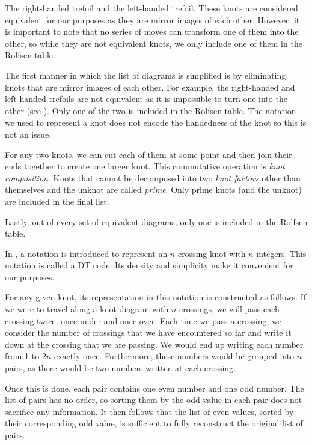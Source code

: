 \begin{paper}
{The right-handed trefoil and the left-handed trefoil.
These knots are considered equivalent for our purposes as they are mirror images
of each other.
However, it is important to note that no series of moves can transform one of
them into the other, so while they are not equivalent knots, we only include one
of them in the Rolfsen table.}

The first manner in which the list of diagrams is simplified is by eliminating
knots that are mirror images of each other.
For example, the right-handed and left-handed trefoils are not equivalent as it
is impossible to turn one into the other (see \figTrefoil).
Only one of the two is included in the Rolfsen table.
The notation we used to represent a knot does not encode the handedness of the
knot so this is not an issue.

For any two knots, we can cut each of them at some point and then join their
ends together to create one larger knot.
This commutative operation is \textit{knot composition}.
Knots that cannot be decomposed into two \textit{knot factors} other than
themselves and the unknot are called \textit{prime}.
Only prime knots (and the unknot) are included in the final list.

Lastly, out of every set of equivalent diagrams, only one is included in the
Rolfsen table.


In \cite{htw}, a notation is introduced to represent an $n$-crossing knot with
$n$ integers.
This notation is called a DT code.
Its density and simplicity make it convenient for our purposes.

For any given knot, its representation in this notation is constructed as
follows.
If we were to travel along a knot diagram with $n$ crossings, we will pass each
crossing twice, once under and once over.
Each time we pass a crossing, we consider the number of crossings that we
have encountered so far and write it down at the crossing that we are passing.
We would end up writing each number from 1 to $2n$ exactly once.
Furthermore, these numbers would be grouped into $n$ pairs, as there would be
two numbers written at each crossing.

Once this is done, each pair contains one even number and one odd number.
The list of pairs has no order, so sorting them by the odd value in each pair
does not sacrifice any information.
It then follows that the list of even values, sorted by their corresponding odd
value, is sufficient to fully reconstruct the original list of pairs.\\


\end{paper}
